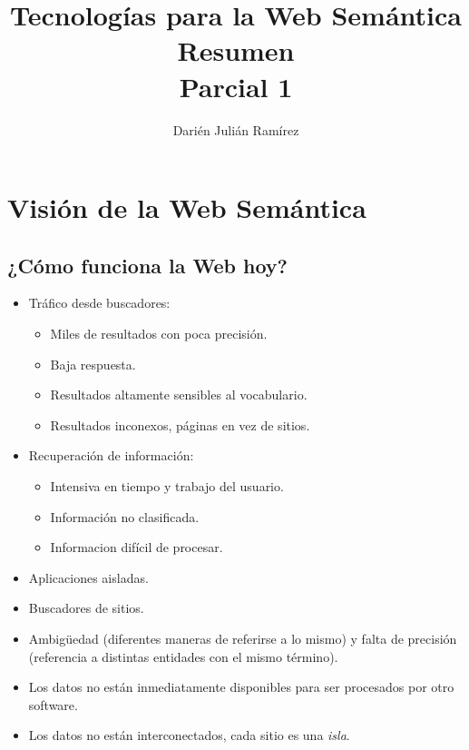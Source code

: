 \documentclass[a4paper,12pt,twoside,final,spanish]{article}
\title{\Huge Tecnologías para la Web Semántica\\
Resumen\\
Parcial 1}
\author{Darién Julián Ramírez}
\date{\vspace{-5ex}}
\begin{document}
\maketitle %

\tableofcontents %

\cleardoublepage

\section{Visión de la Web Semántica}

\subsection{¿Cómo funciona la Web hoy?}

\begin{itemize}
\item Tráfico desde buscadores:
	\begin{itemize}
	\item Miles de resultados con poca precisión.
	\item Baja respuesta.
	\item Resultados altamente sensibles al vocabulario.
	\item  Resultados inconexos, páginas en vez de sitios.
	\end{itemize}
	
\item Recuperación de información:
	\begin{itemize}
	\item Intensiva en tiempo y trabajo del usuario.
	\item Información no clasificada.
	\item Informacion difícil de procesar.
	\end{itemize}
	
\item Aplicaciones aisladas.

\item Buscadores de sitios.

\item Ambigüedad (diferentes maneras de referirse a lo mismo) y falta de precisión (referencia a distintas entidades con el mismo término).

\item Los datos no están inmediatamente disponibles para ser procesados por otro software.

\item Los datos no están interconectados, cada sitio es una \textit{isla}.


\end{itemize}
\end{document}
